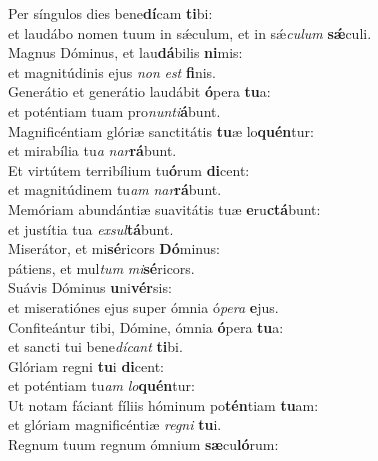 \evenverse Per síngulos dies bene\textbf{dí}cam \textbf{ti}bi:~\*\\
\evenverse et laudábo nomen tuum in sǽculum, et in sǽ\textit{cu}\textit{lum} \textbf{sǽ}culi.\\
\oddverse Magnus Dóminus, et lau\textbf{dá}bilis \textbf{ni}mis:~\*\\
\oddverse et magnitúdinis ejus \textit{non} \textit{est} \textbf{fi}nis.\\
\evenverse Generátio et generátio laudábit \textbf{ó}pera \textbf{tu}a:~\*\\
\evenverse et poténtiam tuam pro\textit{nun}\textit{ti}\textbf{á}bunt.\\
\oddverse Magnificéntiam glóriæ sanctitátis \textbf{tu}æ lo\textbf{quén}tur:~\*\\
\oddverse et mirabília tu\textit{a} \textit{nar}\textbf{rá}bunt.\\
\evenverse Et virtútem terribílium tu\textbf{ó}rum \textbf{di}cent:~\*\\
\evenverse et magnitúdinem tu\textit{am} \textit{nar}\textbf{rá}bunt.\\
\oddverse Memóriam abundántiæ suavitátis tuæ \textbf{e}ru\textbf{ctá}bunt:~\*\\
\oddverse et justítia tua \textit{ex}\textit{sul}\textbf{tá}bunt.\\
\evenverse Miserátor, et mi\textbf{sé}ricors \textbf{Dó}minus:~\*\\
\evenverse pátiens, et mul\textit{tum} \textit{mi}\textbf{sé}ricors.\\
\oddverse Suávis Dóminus \textbf{u}ni\textbf{vér}sis:~\*\\
\oddverse et miseratiónes ejus super ómnia ó\textit{pe}\textit{ra} \textbf{e}jus.\\
\evenverse Confiteántur tibi, Dómine, ómnia \textbf{ó}pera \textbf{tu}a:~\*\\
\evenverse et sancti tui bene\textit{dí}\textit{cant} \textbf{ti}bi.\\
\oddverse Glóriam regni \textbf{tu}i \textbf{di}cent:~\*\\
\oddverse et poténtiam tu\textit{am} \textit{lo}\textbf{quén}tur:\\
\evenverse Ut notam fáciant fíliis hóminum po\textbf{tén}tiam \textbf{tu}am:~\*\\
\evenverse et glóriam magnificéntiæ \textit{re}\textit{gni} \textbf{tu}i.\\
\oddverse Regnum tuum regnum ómnium \textbf{sæ}cu\textbf{ló}rum:~\*\\
